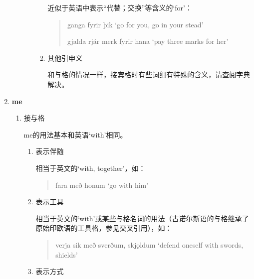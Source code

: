 \begin{enumerate}[itemindent=1em, label=\textbf{\arabic*}.]
\begin{enumerate}
\begin{enumerate}
\begin{enumerate}
                                        近似于英语中表示“代替；交换”等含义的`for'：
                                        \begin{quote}
                                            ganga fyrir þik `go for you, go in your stead'

                                            gjalda \th rjár merk fyrir hana `pay three marks for her'
                                        \end{quote}

                                  \item 其他引申义

                                        和与格的情况一样，接宾格时有些词组有特殊的含义，请查阅字典解决。
                              \end{enumerate}
                    \end{enumerate}

          \end{enumerate}

    \item \textbf{me\dh}
          \begin{enumerate}
              \item 接与格

                    me\dh 的用法基本和英语`with'相同。
                    \begin{enumerate}
                        \item 表示伴随

                              相当于英文的`with, together'，如：
                              \begin{quote}
                                  fara með honum `go with him'
                              \end{quote}

                        \item 表示工具

                              相当于英文的`with'或某些与格名词的用法（古诺尔斯语的与格继承了原始印欧语的工具格，参见交叉引用），如：
                              \begin{quote}
                                  verja sik með sverðum, skj\k{o}ldum `defend oneself with swords, shields'
                              \end{quote}

                        \item 表示方式


\end{enumerate}
\end{enumerate}
\end{enumerate}
